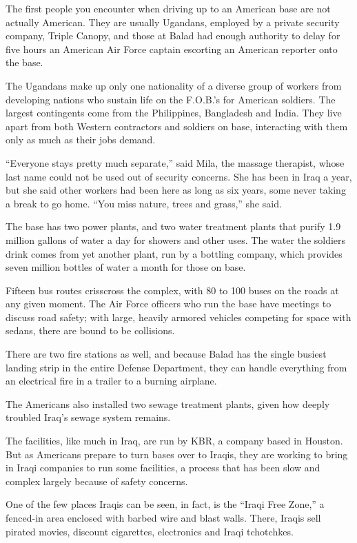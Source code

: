 ﻿\documentclass[12pt]{article}
\begin{document}
The first people you encounter when driving up to an American base are not actually American. They
are usually Ugandans, employed by a private security company, Triple Canopy, and those at Balad had
enough authority to delay for five hours an American Air Force captain escorting an American
reporter onto the base.

The Ugandans make up only one nationality of a diverse group of workers from developing nations who
sustain life on the F.O.B.'s for American soldiers. The largest contingents come from the
Philippines, Bangladesh and India. They live apart from both Western contractors and soldiers on
base, interacting with them only as much as their jobs demand.

``Everyone stays pretty much separate,'' said Mila, the massage therapist, whose last name could not
be used out of security concerns. She has been in Iraq a year, but she said other workers had been
here as long as six years, some never taking a break to go home. ``You miss nature, trees and
grass,'' she said.

The base has two power plants, and two water treatment plants that purify 1.9 million gallons of
water a day for showers and other uses. The water the soldiers drink comes from yet another plant,
run by a bottling company, which provides seven million bottles of water a month for those on base.

Fifteen bus routes crisscross the complex, with 80 to 100 buses on the roads at any given moment.
The Air Force officers who run the base have meetings to discuss road safety; with large, heavily
armored vehicles competing for space with sedans, there are bound to be collisions.

There are two fire stations as well, and because Balad has the single busiest landing strip in the
entire Defense Department, they can handle everything from an electrical fire in a trailer to a
burning airplane.

The Americans also installed two sewage treatment plants, given how deeply troubled Iraq's sewage
system remains.

The facilities, like much in Iraq, are run by KBR, a company based in Houston. But as Americans
prepare to turn bases over to Iraqis, they are working to bring in Iraqi companies to run some
facilities, a process that has been slow and complex largely because of safety concerns.

One of the few places Iraqis can be seen, in fact, is the ``Iraqi Free Zone,'' a fenced-in area
enclosed with barbed wire and blast walls. There, Iraqis sell pirated movies, discount cigarettes,
electronics and Iraqi tchotchkes.
\end{document}
